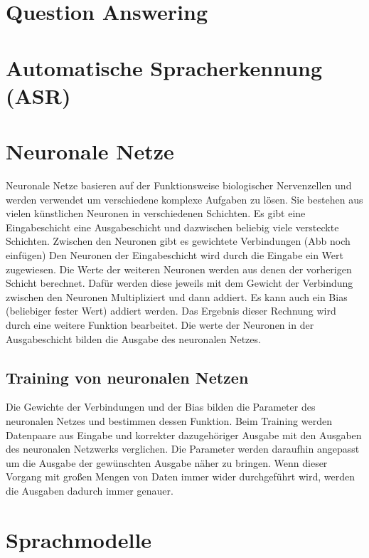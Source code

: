 
\section{Question Answering}

\section{Automatische Spracherkennung (ASR)}

\section{Neuronale Netze}
Neuronale Netze basieren auf der Funktionsweise biologischer Nervenzellen und werden verwendet um verschiedene komplexe Aufgaben zu lösen.
Sie bestehen aus vielen künstlichen Neuronen in verschiedenen Schichten.
Es gibt eine Eingabeschicht eine Ausgabeschicht und dazwischen beliebig viele versteckte Schichten.
Zwischen den Neuronen gibt es gewichtete Verbindungen (Abb noch einfügen)
Den Neuronen der Eingabeschicht wird durch die Eingabe ein Wert zugewiesen.
Die Werte der weiteren Neuronen werden aus denen der vorherigen Schicht berechnet.
Dafür werden diese jeweils mit dem Gewicht der Verbindung zwischen den Neuronen Multipliziert und dann addiert.
Es kann auch ein Bias (beliebiger fester Wert) addiert werden.
Das Ergebnis dieser Rechnung wird durch eine weitere Funktion bearbeitet.
Die werte der Neuronen in der Ausgabeschicht bilden die Ausgabe des neuronalen Netzes.

\subsection{Training von neuronalen Netzen}
Die Gewichte der Verbindungen und der Bias bilden die Parameter des neuronalen Netzes und bestimmen dessen Funktion.
Beim Training werden Datenpaare aus Eingabe und korrekter dazugehöriger Ausgabe mit den Ausgaben des neuronalen Netzwerks verglichen.
Die Parameter werden daraufhin angepasst um die Ausgabe der gewünschten Ausgabe näher zu bringen.
Wenn dieser Vorgang mit großen Mengen von Daten immer wider durchgeführt wird, werden die Ausgaben dadurch immer genauer.

\section{Sprachmodelle}

